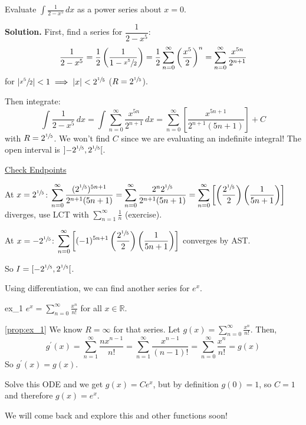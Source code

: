 \begin{Example}{}{}
    Evaluate $ \displaystyle \int \frac{1}{2-x^5} \, d{x}  $
    as a power series about $ x=0 $.

    \textbf{Solution.} First, find a series for $ \dfrac{1}{2-x^5} $:
    \[ \frac{1}{2-x^5}
        =\frac{1}{2} \left( \frac{1}{1-\sfrac{x^5}{2}} \right)
        =\frac{1}{2} \sum\limits_{n=0}^{\infty} \left( \frac{x^5}{2}  \right)^n
        =\sum\limits_{n=0}^{\infty} \frac{x^{5n}}{2^{n+1}}  \]
    for $ \abs*{\sfrac{x^5}{2} }<1\implies \abs{x}<2^{\sfrac{1}{5}} $ ($ R=2^{\sfrac{1}{5}} $).

    Then integrate:
    \[ \int \frac{1}{2-x^5} \, d{x} =
        \int \sum\limits_{n=0}^{\infty} \frac{x^{5n}}{2^{n+1}} \, d{x}
        =\sum\limits_{n=0}^{\infty} \left[ \frac{x^{5n+1}}{2^{n+1}(5n+1)}  \right]+C \]
    with $ R=2^{\sfrac{1}{5}} $. We won't find $ C $ since we are evaluating an
    indefinite integral! The open interval is $ \interval[open]{-2^{\sfrac{1}{5}}}{2^{\sfrac{1}{5}  }} $.

    \underline{Check Endpoints}

    At $ x=2^{\sfrac{1}{5}} $: $ \displaystyle \sum\limits_{n=0}^{\infty}
        \frac{(2^{\sfrac{1}{5}})^{5n+1}}{2^{n+1}(5n+1)}=
        \sum\limits_{n=0}^{\infty} \frac{2^n 2^{\sfrac{1}{5}}}{2^{n+1}(5n+1)}
        =\sum\limits_{n=0}^{\infty} \left[ \left( \frac{2^{\sfrac{1}{5} }}{2} \right)
            \left( \frac{1}{5n+1} \right) \right]  $ diverges,
    use LCT with $ \sum\limits_{n=1}^{\infty} \frac{1}{n} $ (exercise).

    At $ x=-2^{\sfrac{1}{5} } $:
    $ \displaystyle \sum\limits_{n=0}^{\infty}
        \left[(-1)^{5n+1}\left( \frac{2^{\sfrac{1}{5} }}{2}  \right)
            \left( \frac{1}{5n+1}  \right)\right] $ converges by AST\@.

    So $ I=\interval[open right]{-2^{\sfrac{1}{5} }}{2^{\sfrac{1}{5}}} $.
\end{Example}

Using differentiation, we can find another series for $ e^x $.

\begin{Proposition}{}{ex_1}
    $ \displaystyle e^x=\sum\limits_{n=0}^{\infty} \frac{x^n}{n!} $
    for all $ x\in\mathbb{R} $.
\end{Proposition}

\begin{Proof}{\ref{prop:ex_1}}{}
    We know $ R=\infty $ for that series. Let $ g(x)=\displaystyle \sum\limits_{n=0}^{\infty}
        \frac{x^n}{n!} $. Then,
    \[ g^\prime(x)=\sum\limits_{n=1}^{\infty} \frac{n x^{n-1}}{n!}
        =\sum\limits_{n=1}^{\infty} \frac{x^{n-1}}{(n-1)!}
        =\sum\limits_{n=0}^{\infty} \frac{x^n}{n!}=g(x) \]
    So $ g^\prime(x)=g(x) $.

    Solve this ODE and we get $ g(x)=Ce^x $, but by definition $ g(0)=1 $,
    so $ C=1 $ and therefore $ g(x)=e^x $.
\end{Proof}

We will come back and explore this and other functions soon!
